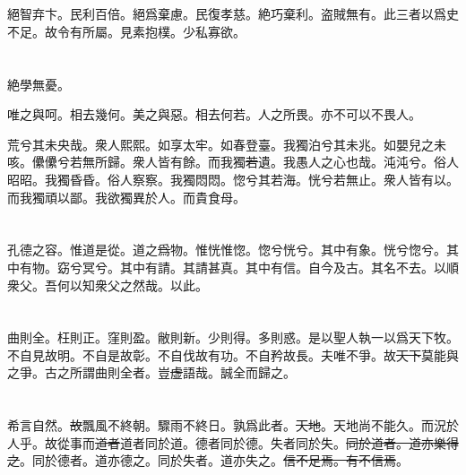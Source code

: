 \documentclass[a5paper]{ctexbook}
\newcommand{\bo}[1]{\textcolor[RGB]{0,255,255}{#1}}
\newcommand{\jian}[1]{\textcolor[RGB]{0,255,0}{#1}}
\def\del{\sout}
\begin{document}
    \chapter{}

    \jian{絕智弃卞}。民利百倍。\jian{絕爲棄慮}。民復孝慈。絶巧棄利。盗賊無有。此三者以爲\jian{史}不足。故令有所屬。見素抱樸。少私寡欲。

    \chapter{}

    絶學無憂。

    唯之與\bo{呵}。相去幾何。\jian{美}之與惡。相去\bo{何若}。人之所畏。\jian{亦不可以不畏人}。

    荒兮其未央哉。衆人熙熙。如享太牢。如春登臺。我獨泊兮其未兆。如嬰兒之未\bo{咳}。儽儽兮若無所歸。衆人皆有餘。而我獨\bo{\del{若}}遺。我愚人之心也哉。沌沌兮。俗人昭昭。我獨昏昏。俗人察察。我獨悶悶。\bo{惚}兮其若海。\bo{恍}兮若無止。衆人皆有以。而我獨頑\bo{以}鄙。我\bo{欲}獨異於人。而貴食母。

    \chapter{}

    孔德之容。惟道是從。道之\bo{\del{爲}}物。惟恍惟惚。惚兮恍兮。其中有象。恍兮惚兮。其中有物。窈兮冥兮。其中有\bo{請}。其\bo{請}甚真。其中有信。\bo{自今及古}。其名不去。以\bo{順}衆\bo{父}。吾何以知衆\bo{父}之\bo{然}哉。以此。

    \chapter{}

    曲則全。枉則\bo{正}。窪則盈。敝則新。少則得。多則惑。是以聖人\bo{執}一\bo{以}爲天下\bo{牧}。不自見故明。不自是故彰。不自伐故有功。不自矜故長。夫唯不爭。故\bo{\del{天下}}莫能與之爭。古之所謂曲則全者。豈\bo{\del{虚}}\bo{語}哉。誠全而歸之。

    \chapter{}

    希言自然。\bo{\del{故}}飄風不終朝。驟雨不終日。孰爲此者。\bo{\del{天地}}。天地尚不能久。而況於人乎。故從事\bo{而}\bo{\del{道者}}道者同於道。德者同於德。失者同於失。\bo{\del{同於道者。道亦樂得之}}。同於德者。\bo{道亦德之}。同於失者。\bo{道亦失之}。\bo{\del{信不足焉。有不信焉}}。
\end{document}
